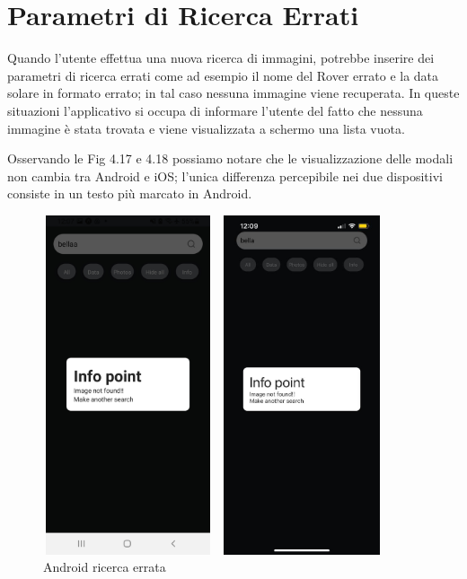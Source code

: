 \section*{Parametri di Ricerca Errati}
Quando l'utente effettua una nuova ricerca di immagini, potrebbe inserire dei parametri di ricerca errati come ad esempio il nome del Rover errato e la data solare in formato errato; 
in tal caso nessuna immagine viene recuperata. In queste situazioni l'applicativo si occupa di informare l'utente del fatto che nessuna immagine \`e
stata trovata e viene visualizzata a schermo una lista vuota.

Osservando le Fig 4.17 e 4.18 possiamo notare che le visualizzazione delle modali non cambia tra Android e iOS; l'unica differenza percepibile nei due dispositivi consiste in un testo pi\`u marcato in Android.
\begin{figure}[h]
    \begin{minipage}[h]{0.47\textwidth}
        \centering
        \includegraphics[width=5cm, height=10cm]{images/immaginiAndroid/ricercaErrata.jpg}
        \caption{\label{ricercaErrataAndroid} Android ricerca errata}
    \end{minipage}
    \hfill
    \begin{minipage}[h]{0.47\textwidth}
        \centering
        \includegraphics[width=5cm, height=10cm]{images/immaginiPhone/ricercaErrata.jpeg}

\end{minipage}
\end{figure}
